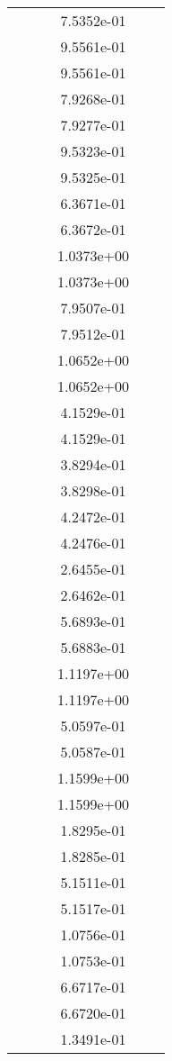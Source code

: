 \begin{xltabular}{\textwidth}{r|rS[table-format=1.3e+2]S[table-format=1.4e+2]S[table-format=1.4e+2]S[table-format=-1.5]}
&  &  & 7.5352e-01 & & \\
&  &  & 9.5561e-01 & & \\
&  &  & 9.5561e-01 & & \\
&  &  & 7.9268e-01 & & \\
&  &  & 7.9277e-01 & & \\
&  &  & 9.5323e-01 & & \\
&  &  & 9.5325e-01 & & \\
&  &  & 6.3671e-01 & & \\
&  &  & 6.3672e-01 & & \\
&  &  & 1.0373e+00 & & \\
&  &  & 1.0373e+00 & & \\
&  &  & 7.9507e-01 & & \\
&  &  & 7.9512e-01 & & \\
&  &  & 1.0652e+00 & & \\
&  &  & 1.0652e+00 & & \\
&  &  & 4.1529e-01 & & \\
&  &  & 4.1529e-01 & & \\
&  &  & 3.8294e-01 & & \\
&  &  & 3.8298e-01 & & \\
&  &  & 4.2472e-01 & & \\
&  &  & 4.2476e-01 & & \\
&  &  & 2.6455e-01 & & \\
&  &  & 2.6462e-01 & & \\
&  &  & 5.6893e-01 & & \\
&  &  & 5.6883e-01 & & \\
&  &  & 1.1197e+00 & & \\
&  &  & 1.1197e+00 & & \\
&  &  & 5.0597e-01 & & \\
&  &  & 5.0587e-01 & & \\
&  &  & 1.1599e+00 & & \\
&  &  & 1.1599e+00 & & \\
&  &  & 1.8295e-01 & & \\
&  &  & 1.8285e-01 & & \\
&  &  & 5.1511e-01 & & \\
&  &  & 5.1517e-01 & & \\
&  &  & 1.0756e-01 & & \\
&  &  & 1.0753e-01 & & \\
&  &  & 6.6717e-01 & & \\
&  &  & 6.6720e-01 & & \\
&  &  & 1.3491e-01 & & \\

\end{xltabular}
